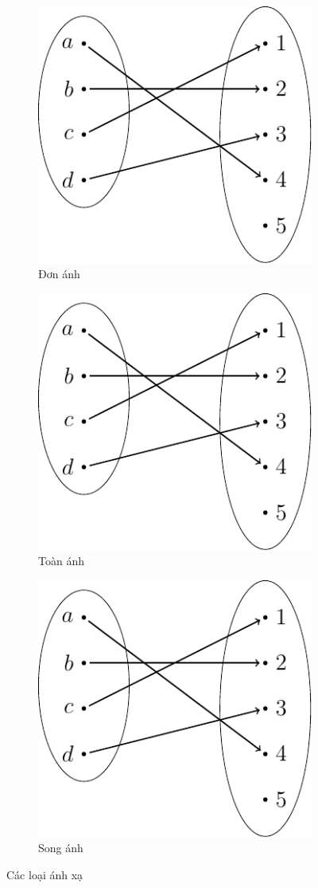 \begin{figure}[htb]
    \centering
    \begin{subfigure}{0.4\textwidth}
        \includegraphics[page=1]{figures/maps.pdf}
        \caption{Đơn ánh}
    \end{subfigure}
    \hfill
    \begin{subfigure}{0.4\textwidth}
        \includegraphics[page=2]{figures/maps.pdf}
        \caption{Toàn ánh}
    \end{subfigure}
    \hfill
    \begin{subfigure}{0.4\textwidth}
        \includegraphics[page=3]{figures/maps.pdf}
        \caption{Song ánh}
    \end{subfigure}
    \caption{Các loại ánh xạ}
\end{figure}

